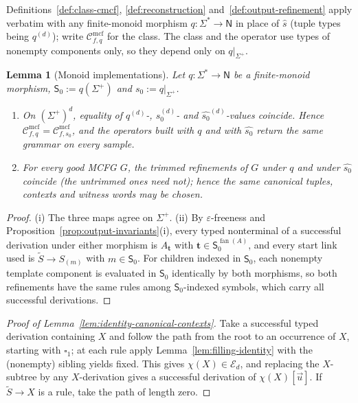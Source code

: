 \documentclass[11pt]{article}
\numberwithin{equation}{section}
\theoremstyle{plain}
\newtheorem{lemma}[theorem]{Lemma}
\theoremstyle{definition}
\theoremstyle{remark}
\newcommand{\Cmcf}[2]{\mathcal{C}^{\mathrm{mcf}}_{#1,#2}}
\newcommand{\tuple}[1]{\vec{#1}}
\newcommand{\blank}{\square}
\newcommand{\eps}{\varepsilon}
\newcommand{\fan}{\operatorname{fan}}
\theoremstyle{plain}
\begin{document}
Definitions~\ref{def:class-cmcf}, \ref{def:reconstruction}
and~\ref{def:output-refinement} apply verbatim with any finite-monoid morphism
$q:\Sigma^*\to\mathsf N$ in place of $\widehat s$ (tuple types being $q^{(d)}$); write
$\Cmcf{f}{q}$ for the class.  The class and the operator use types of nonempty
components only, so they depend only on $q|_{\Sigma^+}$.

\begin{lemma}[Monoid implementations]
\label{lem:semigroup-transfer}
Let $q:\Sigma^*\to \mathsf N$ be a finite-monoid morphism, $\mathsf S_0:=q(\Sigma^+)$ and
$s_0:=q|_{\Sigma^+}$.
\begin{enumerate}[label=\textup{(\roman*)}]
\item On $(\Sigma^+)^d$, equality of $q^{(d)}$-, $s_0^{(d)}$- and
$\widehat{s_0}^{(d)}$-values coincide.  Hence $\Cmcf{f}{q}=\Cmcf{f}{s_0}$, and the
operators built with $q$ and with $\widehat{s_0}$ return the same grammar on every
sample.
\item For every good MCFG $G$, the trimmed refinements of $G$ under $q$ and under
$\widehat{s_0}$ coincide (the untrimmed ones need not); hence the same canonical
tuples, contexts and witness words may be chosen.
\end{enumerate}
\end{lemma}

\begin{proof}
(i) The three maps agree on $\Sigma^+$.  (ii) By $\eps$-freeness and
Proposition~\ref{prop:output-invariants}(i), every typed nonterminal of a successful
derivation under either morphism is $A_{\mathbf t}$ with $\mathbf t\in \mathsf S_0^{\fan(A)}$, and
every start link used is $\widetilde S\to S_{(m)}$ with $m\in \mathsf S_0$.  For children
indexed in $\mathsf S_0$, each nonempty template component is evaluated in $\mathsf S_0$ identically by
both morphisms, so both refinements have the same rules among $\mathsf S_0$-indexed symbols,
which carry all successful derivations.
\end{proof}

\begin{proof}[Proof of Lemma~\ref{lem:identity-canonical-contexts}]
Take a successful typed derivation containing $X$ and follow the path from the root to
an occurrence of $X$, starting with $\blank_1$; at each rule apply
Lemma~\ref{lem:filling-identity} with the (nonempty) sibling yields fixed.  This gives
$\chi(X)\in\mathcal E_d$, and replacing the $X$-subtree by any $X$-derivation gives a
successful derivation of $\chi(X)[\tuple u]$.  If $\widetilde S\to X$ is a rule, take the
path of length zero.
\end{proof}
\end{document}
